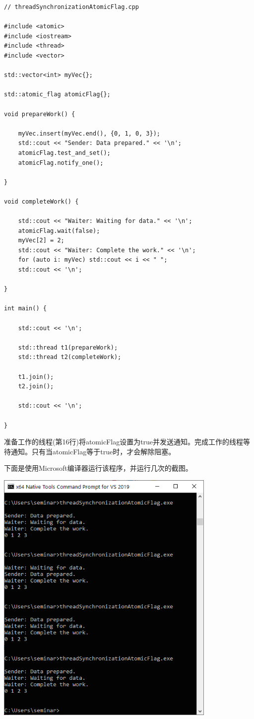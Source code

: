 \begin{lstlisting}[style=styleCXX]
// threadSynchronizationAtomicFlag.cpp

#include <atomic>
#include <iostream>
#include <thread>
#include <vector>

std::vector<int> myVec{};

std::atomic_flag atomicFlag{};

void prepareWork() {

	myVec.insert(myVec.end(), {0, 1, 0, 3});
	std::cout << "Sender: Data prepared." << '\n';
	atomicFlag.test_and_set();
	atomicFlag.notify_one();

}

void completeWork() {

	std::cout << "Waiter: Waiting for data." << '\n';
	atomicFlag.wait(false);
	myVec[2] = 2;
	std::cout << "Waiter: Complete the work." << '\n';
	for (auto i: myVec) std::cout << i << " ";
	std::cout << '\n';

}

int main() {

	std::cout << '\n';
	
	std::thread t1(prepareWork);
	std::thread t2(completeWork);
	
	t1.join();
	t2.join();
	
	std::cout << '\n';

}
\end{lstlisting}

准备工作的线程(第16行)将atomicFlag设置为true并发送通知。完成工作的线程等待通知。只有当atomicFlag等于true时，才会解除阻塞。

下面是使用Microsoft编译器运行该程序，并运行几次的截图。

\begin{center}
\includegraphics[width=0.8\textwidth]{content/3/chapter6/images/13.png}\\
\end{center}

